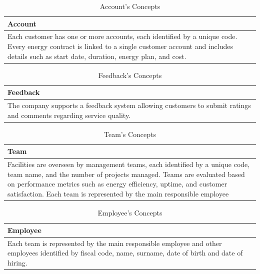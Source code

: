 \begin{table}[H]
    \renewcommand{\arraystretch}{1.3} %
    \begin{tabularx}{\textwidth}{|X|}
    \hline   \textbf{Account}    \\ \hline
    Each customer has one or more accounts, each identified by a unique code. Every energy contract is linked to a single customer account and includes details such as start date, duration, energy plan, and cost. \\ \hline
    \end{tabularx}
    \caption{Account's Concepts}
    \end{table}

\begin{table}[H]
    \renewcommand{\arraystretch}{1.3} %
    \begin{tabularx}{\textwidth}{|X|}
    \hline  \textbf{Feedback}    \\ \hline
    The company supports a feedback system allowing customers to submit ratings and comments regarding service quality. \\ \hline
    \end{tabularx}
    \caption{Feedback's Concepts}
    \end{table}

\begin{table}[H]
    \renewcommand{\arraystretch}{1.3} %
    \begin{tabularx}{\textwidth}{|X|}
    \hline  \textbf{Team}    \\ \hline
    Facilities are overseen by management teams, each identified by a unique code, team name, and the number of projects managed. Teams are evaluated based on performance metrics such as energy efficiency, uptime, and customer satisfaction. Each team is represented by the main responsible employee \\ \hline
    \end{tabularx}
    \caption{Team's Concepts}
    \end{table}

\begin{table}[H]
    \renewcommand{\arraystretch}{1.3} %
    \begin{tabularx}{\textwidth}{|X|}
    \hline  \textbf{Employee}    \\ \hline
    Each team is represented by the main responsible employee and other employees identified by fiscal code, name, surname, date of birth and date of hiring. \\ \hline
    \end{tabularx}
    \caption{Employee's Concepts}
    \end{table}

